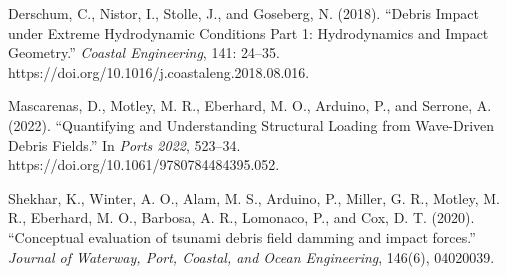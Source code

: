\documentclass{article}
\begin{document}
Derschum, C., Nistor, I., Stolle, J., and Goseberg, N. (2018). ``Debris Impact under Extreme Hydrodynamic Conditions Part 1: Hydrodynamics and Impact Geometry.'' \textit{Coastal Engineering}, 141: 24–35. https://doi.org/10.1016/j.coastaleng.2018.08.016.

Mascarenas, D., Motley, M. R., Eberhard, M. O., Arduino, P., and Serrone, A. (2022). ``Quantifying and Understanding Structural Loading from Wave-Driven Debris Fields.'' In \textit{Ports 2022}, 523–34. https://doi.org/10.1061/9780784484395.052.

Shekhar, K., Winter, A. O., Alam, M. S., Arduino, P., Miller, G. R., Motley, M. R., Eberhard, M. O., Barbosa, A. R., Lomonaco, P., and Cox, D. T. (2020). ``Conceptual evaluation of tsunami debris field damming and impact forces.'' \textit{Journal of Waterway, Port, Coastal, and Ocean Engineering}, 146(6), 04020039.
\end{document}

